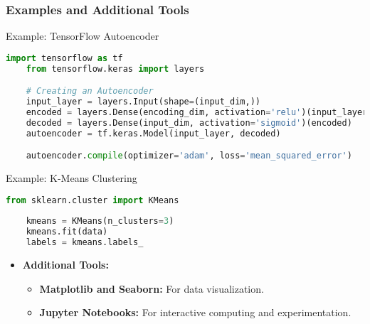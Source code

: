 \documentclass[aspectratio=169]{beamer}
\begin{document}
\begin{frame}[fragile]
    \frametitle{Examples and Additional Tools}
    
    \begin{block}{Example: TensorFlow Autoencoder}
    \begin{lstlisting}[language=Python]
    import tensorflow as tf
    from tensorflow.keras import layers

    # Creating an Autoencoder
    input_layer = layers.Input(shape=(input_dim,))
    encoded = layers.Dense(encoding_dim, activation='relu')(input_layer)
    decoded = layers.Dense(input_dim, activation='sigmoid')(encoded)
    autoencoder = tf.keras.Model(input_layer, decoded)

    autoencoder.compile(optimizer='adam', loss='mean_squared_error')
    \end{lstlisting}
    \end{block}

    \begin{block}{Example: K-Means Clustering}
    \begin{lstlisting}[language=Python]
    from sklearn.cluster import KMeans
    
    kmeans = KMeans(n_clusters=3)
    kmeans.fit(data)
    labels = kmeans.labels_
    \end{lstlisting}
    \end{block}
    
    \begin{itemize}
        \item \textbf{Additional Tools:}
        \begin{itemize}
            \item \textbf{Matplotlib and Seaborn:} For data visualization.
            \item \textbf{Jupyter Notebooks:} For interactive computing and experimentation.
        \end{itemize}
    \end{itemize}
\end{frame}
\end{document}
